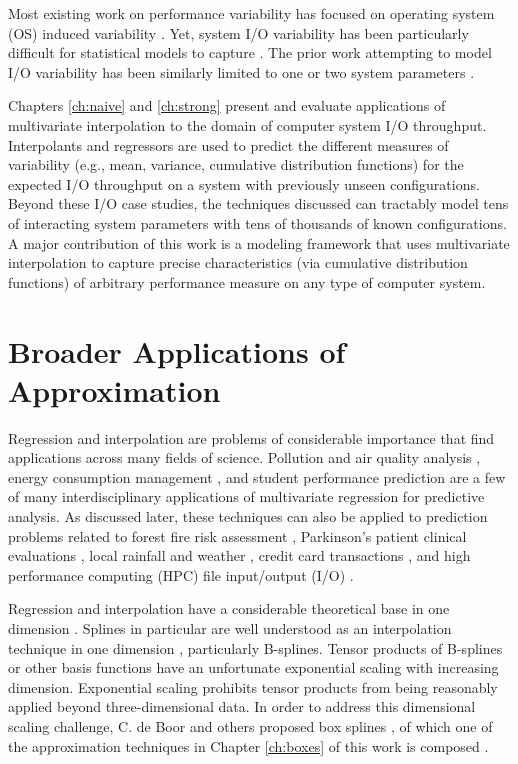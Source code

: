 Most existing work on performance variability has focused on operating system (OS) induced variability \cite{beckman2008benchmarking,de2007identifying}. Yet, system I/O variability has been particularly difficult for statistical models to capture \cite{bailey2005performance}. The prior work attempting to model I/O variability has been similarly limited to one or two system parameters \cite{lofstead2010managing}.

Chapters \ref{ch:naive} and \ref{ch:strong} present and evaluate applications of multivariate interpolation to the domain of computer system I/O throughput. Interpolants and regressors are used to predict the different measures of variability (e.g., mean, variance, cumulative distribution functions) for the expected I/O throughput on a system with previously unseen configurations. Beyond these I/O case studies, the techniques discussed can tractably model tens of interacting system parameters with tens of thousands of known configurations. A major contribution of this work is a modeling framework that uses multivariate interpolation to capture precise characteristics (via cumulative distribution functions) of arbitrary performance measure on any type of computer system.


\section{Broader Applications of Approximation}

Regression and interpolation are problems of considerable importance
that find applications across many fields of science. Pollution and
air quality analysis \cite{de2008field}, energy consumption management
\cite{lazos2014optimisation}, and student performance prediction
\cite{cortez2008using,lux2016applications} are a few of many
interdisciplinary applications of multivariate regression for
predictive analysis. As discussed later, these techniques can also be
applied to prediction problems related to forest fire risk assessment
\cite{cortez2007data}, Parkinson's patient clinical evaluations
\cite{tsanas2010accurate}, local rainfall and weather
\cite{williams2009rattle}, credit card transactions
\cite{pozzolo2015calibrating}, and high performance computing (HPC)
file input/output (I/O) \cite{lux2018nonparametric}.

Regression and interpolation have a considerable theoretical base in
one dimension \cite{cheney2009course}. Splines in particular are well
understood as an interpolation technique in one dimension
\cite{de1978practical}, particularly B-splines. Tensor products of
B-splines \cite{unther1996interpolating} or other basis functions have
an unfortunate exponential scaling with increasing
dimension. Exponential scaling prohibits tensor products from being
reasonably applied beyond three-dimensional data. In order to address
this dimensional scaling challenge, C. de Boor and others proposed box
splines \cite{de2013box}, of which one of the approximation techniques
in Chapter \ref{ch:boxes} of this work is composed \cite{lux2018novel}.

